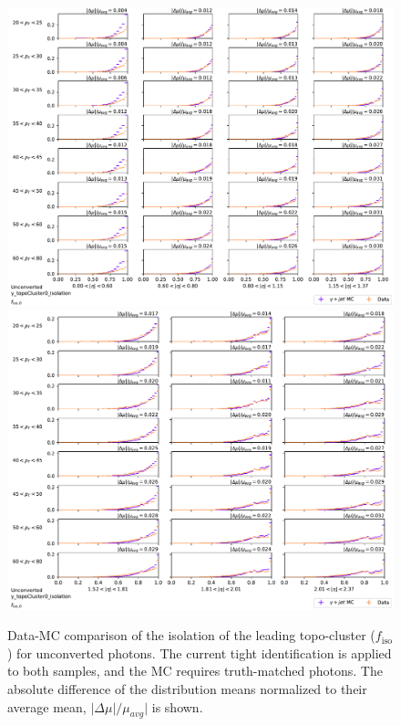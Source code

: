 \begin{figure}[!thp]
    \centering
    \includegraphics[width=.74\textwidth]{appendices/datamc_images/y_topoCluster0_isolation_Unconverted_lowerEta.pdf}
    \includegraphics[width=.74\textwidth]{appendices/datamc_images/y_topoCluster0_isolation_Unconverted_upperEta.pdf}
    \caption[Data-MC comparison of the isolation of the leading topo-cluster ($f_{\text{iso}}$) for unconverted photons]{Data-MC comparison of the isolation of the leading topo-cluster ($f_{\text{iso}}$) for unconverted photons. The current tight identification is applied to both samples, and the \gls{MC} requires truth-matched photons. The absolute difference of the distribution means normalized to their average mean, $|\Delta \mu|/\mu_{avg}|$ is shown.}
    \label{fig:dmc-u-iso}
\end{figure}



